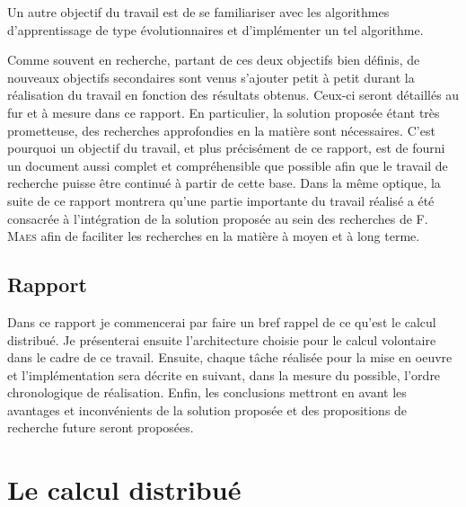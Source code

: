 \documentclass[a4paper, 11pt]{article}
\begin{document}
Un autre objectif du travail est de se familiariser avec les algorithmes d'apprentissage de type évolutionnaires et d'implémenter un tel algorithme.

Comme souvent en recherche, partant de ces deux objectifs bien définis, de nouveaux objectifs secondaires sont venus s'ajouter petit à petit durant la réalisation du travail en fonction des résultats obtenus. Ceux-ci seront détaillés au fur et à mesure dans ce rapport. En particulier, la solution proposée étant très prometteuse, des recherches approfondies en la matière sont nécessaires. C'est pourquoi un objectif du travail, et plus précisément de ce rapport, est de fourni un document aussi complet et compréhensible que possible afin que le travail de recherche puisse être continué à partir de cette base. Dans la même optique, la suite de ce rapport montrera qu'une partie importante du travail réalisé a été consacrée à l'intégration de la solution proposée au sein des recherches de F. \textsc{Maes} afin de faciliter les recherches en la matière à moyen et à long terme. 

\subsection{Rapport} %
Dans ce rapport je commencerai par faire un bref rappel de ce qu'est le calcul distribué. Je présenterai ensuite l'architecture choisie pour le calcul volontaire dans le cadre de ce travail. Ensuite, chaque tâche réalisée pour la mise en oeuvre et l'implémentation sera décrite en suivant, dans la mesure du possible, l'ordre chronologique de réalisation. Enfin, les conclusions mettront en avant les avantages et inconvénients de la solution proposée et des propositions de recherche future seront proposées.

\section{Le calcul distribué}
\end{document}
